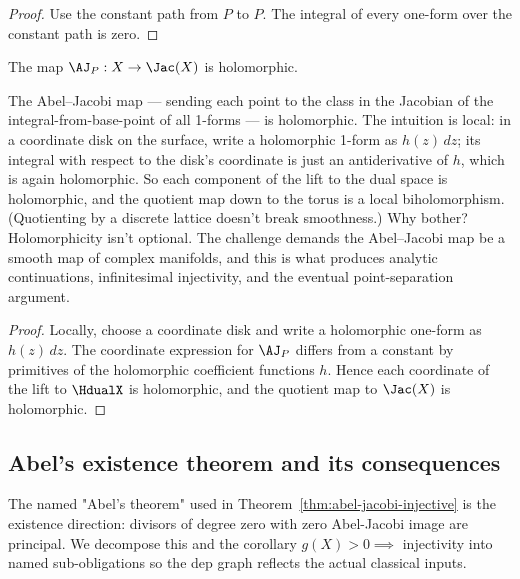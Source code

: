 \begin{proof}
\leanok
Use the constant path from \(P\) to \(P\). The integral of every one-form over
the constant path is zero.
\end{proof}

\begin{lemma}
\label{lem:aj-holomorphic}
The map \(\AJ_P:X\to\Jac(X)\) is holomorphic.
\leanok
\end{lemma}

\begin{layman}
The Abel–Jacobi map — sending each point to the class in the Jacobian
of the integral-from-base-point of all 1-forms — is holomorphic. The
intuition is local: in a coordinate disk on the surface, write a
holomorphic 1-form as \(h(z)\,dz\); its integral with respect to the
disk's coordinate is just an antiderivative of \(h\), which is again
holomorphic. So each component of the lift to the dual space is
holomorphic, and the quotient map down to the torus is a local
biholomorphism. (Quotienting by a discrete lattice doesn't break
smoothness.) Why bother? Holomorphicity isn't optional. The challenge
demands the Abel–Jacobi map be a smooth map of complex manifolds, and
this is what produces analytic continuations, infinitesimal injectivity,
and the eventual point-separation argument.
\end{layman}

\begin{proof}
\leanok
Locally, choose a coordinate disk and write a holomorphic one-form as
\(h(z)\,dz\). The coordinate expression for \(\AJ_P\) differs from a constant
by primitives of the holomorphic coefficient functions \(h\). Hence each
coordinate of the lift to \(\HdualX\) is holomorphic, and the quotient map to
\(\Jac(X)\) is holomorphic.
\end{proof}

\subsection{Abel's existence theorem and its consequences}

The named "Abel's theorem" used in
Theorem~\ref{thm:abel-jacobi-injective} is the existence direction:
divisors of degree zero with zero Abel-Jacobi image are principal. We
decompose this and the corollary \(g(X)>0 \implies\) injectivity into named
sub-obligations so the dep graph reflects the actual classical inputs.


